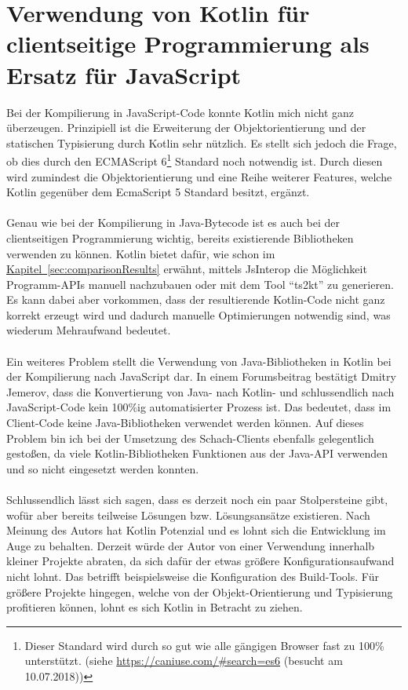 \section{Verwendung von Kotlin für clientseitige Programmierung als Ersatz für JavaScript}\label{sec:conclusionKotlinJS}
Bei der Kompilierung in JavaScript-Code konnte Kotlin mich nicht ganz überzeugen. Prinzipiell ist die Erweiterung der Objektorientierung und der statischen Typisierung durch Kotlin sehr nützlich. Es stellt sich jedoch die Frage, ob dies durch den ECMAScript 6\footnote{Dieser Standard wird durch so gut wie alle gängigen Browser fast zu 100\% unterstützt. (siehe \url{https://caniuse.com/\#search=es6} (besucht am 10.07.2018))} Standard noch notwendig ist. Durch diesen wird zumindest die Objektorientierung und eine Reihe weiterer Features, welche Kotlin gegenüber dem EcmaScript 5 Standard besitzt, ergänzt.\\
\\
Genau wie bei der Kompilierung in Java-Bytecode ist es auch bei der clientseitigen Programmierung wichtig, bereits existierende Bibliotheken verwenden zu können. Kotlin bietet dafür, wie schon im \hyperref[sec:comparisonResults]{Kapitel~\ref{sec:comparisonResults}} erwähnt, mittels \gls{JsInterop} die Möglichkeit Programm-\glspl{API} manuell nachzubauen oder mit dem Tool \enquote{ts2kt} zu generieren. Es kann dabei aber vorkommen, dass der resultierende Kotlin-Code nicht ganz korrekt erzeugt wird und dadurch manuelle Optimierungen notwendig sind, was wiederum Mehraufwand bedeutet.\\
\\
Ein weiteres Problem stellt die Verwendung von Java-Bibliotheken in Kotlin bei der Kompilierung nach JavaScript dar. In einem Forumsbeitrag \cite{kotlinJsUseJava} bestätigt Dmitry Jemerov, dass die Konvertierung von Java- nach Kotlin- und schlussendlich nach JavaScript-Code kein 100\%ig automatisierter Prozess ist. Das bedeutet, dass im Client-Code keine Java-Bibliotheken verwendet werden können. Auf dieses Problem bin ich bei der Umsetzung des Schach-Clients ebenfalls gelegentlich gestoßen, da viele Kotlin-Bibliotheken Funktionen aus der Java-\gls{API} verwenden und so nicht eingesetzt werden konnten.\\
\\
Schlussendlich lässt sich sagen, dass es derzeit noch ein paar Stolpersteine gibt, wofür aber bereits teilweise Lösungen bzw. Lösungsansätze existieren. Nach Meinung des Autors hat Kotlin Potenzial und es lohnt sich die Entwicklung im Auge zu behalten. Derzeit würde der Autor von einer Verwendung innerhalb kleiner Projekte abraten, da sich dafür der etwas größere Konfigurationsaufwand nicht lohnt. Das betrifft beispielsweise die Konfiguration des Build-Tools. Für größere Projekte hingegen, welche von der Objekt-Orientierung und Typisierung profitieren können, lohnt es sich Kotlin in Betracht zu ziehen.